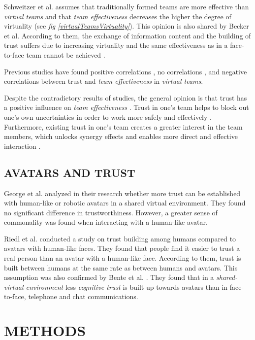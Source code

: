 \documentclass[sigchi]{acmart}
\begin{document}
Schweitzer et al. \citep{schweitzer2010conceptualizing} assumes that traditionally formed teams are more effective than \textit{virtual teams} and that \textit{team effectiveness} decreases the higher the degree of virtuality (see \textit{fig \ref{virtualTeamsVirtuality}}).
This opinion is also shared by Becker et al. According to them, the exchange of information content and the building of trust suffers due to increasing virtuality and the same effectiveness as in a face-to-face team cannot be achieved \citep{becker2002fuhrung}.

Previous studies have found positive correlations \citep{davis2000trusted}, no correlations \citep{hertel2004managing}, and negative correlations \citep{dirks1999effects} between trust and \textit{team effectiveness} in \textit{virtual teams}.

Despite the contradictory results of studies, the general opinion is that trust has a positive influence on \textit{team effectiveness} \citep{en2016trust}. 
Trust in one's team helps to block out one's own uncertainties in order to work more safely and effectively \citep{de2010does}. Furthermore, existing trust in one's team creates a greater interest in the team members, which unlocks synergy effects and enables more direct and effective interaction \citep{dirks1999effects}. 

\subsection{AVATARS AND TRUST}
George et al. \citep{george2018trusting} analyzed in their research whether more trust can be established with human-like or robotic avatars in a shared virtual environment. They found no significant difference in trustworthiness. However, a greater sense of commonality was found when interacting with a human-like avatar.

Riedl et al. \citep{riedl2014trusting} conducted a study on trust building among humans compared to avatars with human-like faces. They found that people find it easier to trust a real person than an avatar with a human-like face. According to them, trust is built between humans at the same rate as between humans and avatars.
This assumption was also confirmed by Bente et al. \citep[S. 54-59]{bente2004social}. They found that in a \textit{shared-virtual-environment} less \textit{cognitive trust} is built up towards avatars than in face-to-face, telephone and chat communications.

\section{METHODS}
\end{document}
